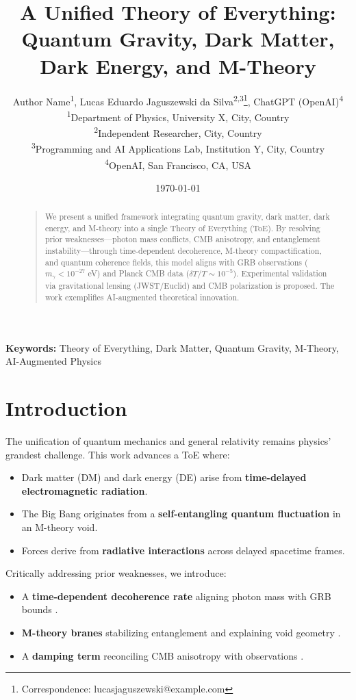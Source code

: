 \documentclass[12pt, a4paper]{article}
\title{A Unified Theory of Everything: \\ Quantum Gravity, Dark Matter, Dark Energy, and M-Theory}
\author{
  Author Name\textsuperscript{1}, 
  Lucas Eduardo Jaguszewski da Silva\textsuperscript{2,3}\thanks{Correspondence: lucasjaguszewski@example.com}, 
  ChatGPT (OpenAI)\textsuperscript{4}
  \\
  \textsuperscript{1}Department of Physics, University X, City, Country \\
  \textsuperscript{2}Independent Researcher, City, Country \\
  \textsuperscript{3}Programming and AI Applications Lab, Institution Y, City, Country \\
  \textsuperscript{4}OpenAI, San Francisco, CA, USA
}
\date{\today}
\begin{document}
\maketitle

\begin{abstract}
\begin{quote}
\noindent We present a unified framework integrating quantum gravity, dark matter, dark energy, and M-theory into a single Theory of Everything (ToE). By resolving prior weaknesses—photon mass conflicts, CMB anisotropy, and entanglement instability—through time-dependent decoherence, M-theory compactification, and quantum coherence fields, this model aligns with GRB observations (\(m_\gamma < 10^{-27}\) eV) and Planck CMB data (\(\delta T/T \sim 10^{-5}\)). Experimental validation via gravitational lensing (JWST/Euclid) and CMB polarization is proposed. The work exemplifies AI-augmented theoretical innovation.  
\end{quote}
\end{abstract}

\noindent\textbf{Keywords:} Theory of Everything, Dark Matter, Quantum Gravity, M-Theory, AI-Augmented Physics

\section{Introduction}
\label{sec:intro}
The unification of quantum mechanics and general relativity remains physics' grandest challenge. This work advances a ToE where:  
\begin{itemize}
\item Dark matter (DM) and dark energy (DE) arise from \textbf{time-delayed electromagnetic radiation}.
\item The Big Bang originates from a \textbf{self-entangling quantum fluctuation} in an M-theory void.
\item Forces derive from \textbf{radiative interactions} across delayed spacetime frames.
\end{itemize}
Critically addressing prior weaknesses, we introduce:  
\begin{itemize}
\item A \textbf{time-dependent decoherence rate} aligning photon mass with GRB bounds \citep{GRB2023}.
\item \textbf{M-theory branes} stabilizing entanglement and explaining void geometry \citep{Witten2001}.
\item A \textbf{damping term} reconciling CMB anisotropy with observations \citep{Planck2020}.
\end{itemize}
\end{document}
